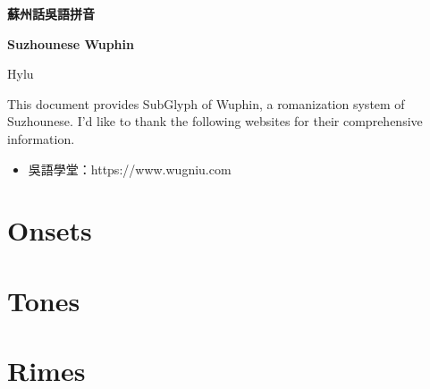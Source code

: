 \documentclass[12pt]{article}
\begin{document}

\begin{center}
    {\Huge \textbf{蘇州話吳語拼音} \par}
    {\Huge \textbf{Suzhounese Wuphin} \par}
    {\Large Hylu \par}
    \hrulefill
\end{center}
This document provides SubGlyph of Wuphin, a romanization system of Suzhounese. I'd like to thank the following websites for their comprehensive information. \par
\begin{itemize}
	\item 吳語學堂：https://www.wugniu.com
\end{itemize}
\section{Onsets}
%
\section{Tones}
%

\section{Rimes}
%
\end{document}
